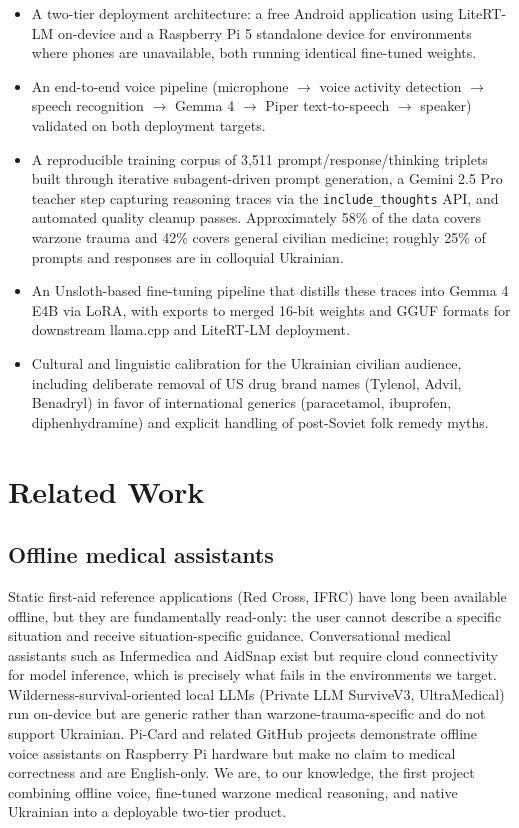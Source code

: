 \documentclass{article}
\theoremstyle{plain}
\theoremstyle{definition}
\theoremstyle{remark}
\begin{document}
\begin{itemize}
\item A two-tier deployment architecture: a free Android application using LiteRT-LM on-device and a Raspberry Pi 5 standalone device for environments where phones are unavailable, both running identical fine-tuned weights.
\item An end-to-end voice pipeline (microphone $\rightarrow$ voice activity detection $\rightarrow$ speech recognition $\rightarrow$ Gemma 4 $\rightarrow$ Piper text-to-speech $\rightarrow$ speaker) validated on both deployment targets.
\item A reproducible training corpus of 3{,}511 prompt/response/thinking triplets built through iterative subagent-driven prompt generation, a Gemini 2.5 Pro teacher step capturing reasoning traces via the \texttt{include\_thoughts} API, and automated quality cleanup passes. Approximately 58\% of the data covers warzone trauma and 42\% covers general civilian medicine; roughly 25\% of prompts and responses are in colloquial Ukrainian.
\item An Unsloth-based fine-tuning pipeline that distills these traces into Gemma 4 E4B via LoRA, with exports to merged 16-bit weights and GGUF formats for downstream llama.cpp and LiteRT-LM deployment.
\item Cultural and linguistic calibration for the Ukrainian civilian audience, including deliberate removal of US drug brand names (Tylenol, Advil, Benadryl) in favor of international generics (paracetamol, ibuprofen, diphenhydramine) and explicit handling of post-Soviet folk remedy myths.
\end{itemize}

\section{Related Work}

\subsection{Offline medical assistants}

Static first-aid reference applications (Red Cross, IFRC) have long been available offline, but they are fundamentally read-only: the user cannot describe a specific situation and receive situation-specific guidance. Conversational medical assistants such as Infermedica and AidSnap exist but require cloud connectivity for model inference, which is precisely what fails in the environments we target. Wilderness-survival-oriented local LLMs (Private LLM SurviveV3, UltraMedical) run on-device but are generic rather than warzone-trauma-specific and do not support Ukrainian. Pi-Card and related GitHub projects demonstrate offline voice assistants on Raspberry Pi hardware but make no claim to medical correctness and are English-only. We are, to our knowledge, the first project combining offline voice, fine-tuned warzone medical reasoning, and native Ukrainian into a deployable two-tier product.
\end{document}
